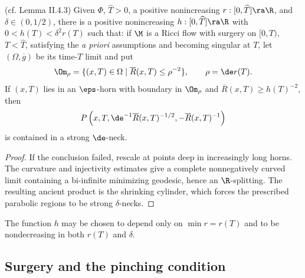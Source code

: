 \begin{lemma}
  \label{lem:kl-necks-horns-existence-ricci-flow-surgery}
(cf. Lemma II.4.3) \label{lemmaII.4.3}
\label{hexists}
Given $\Phi$, $\widehat T>0$, a positive nonincreasing
$r:[0,\widehat T]\ra\R$, and $\delta\in(0,1/2)$, there is a positive
nonincreasing $h:[0,\widehat T]\ra\R$ with $0<h(T)<\delta^2r(T)$ such that:
if $\M$ is a Ricci flow with surgery on $[0,T)$, $T<\widehat T$, satisfying
the \emph{a priori} assumptions and becoming singular at $T$, let
$(\Omega,\overline g)$ be its time-$T$ limit and put
\[
\Om_\rho=\{(x,T)\in\Omega\mid\overline R(x,T)\leq\rho^{-2}\},\qquad
\rho=\de r(T).
\]
If $(x,T)$ lies in an $\eps$-horn with boundary in $\Om_\rho$ and
$\overline R(x,T)\geq h(T)^{-2}$, then
\[
P\left(x,T,\de^{-1}\overline R(x,T)^{-1/2},-\overline R(x,T)^{-1}\right)
\]
is contained in a strong $\de$-neck.
\end{lemma}
\begin{proof}
\sketch If the conclusion failed, rescale at points deep in increasingly long
horns. The curvature and injectivity estimates give a complete nonnegatively
curved limit containing a bi-infinite minimizing geodesic, hence an
$\R$-splitting. The resulting ancient product is the shrinking cylinder,
which forces the prescribed parabolic regions to be strong $\delta$-necks.
\end{proof}

\begin{remark}
  \label{rem:kl-necks-horns-monotonicity-neck-geometry}
The function $h$ may be chosen to depend only on $\min r=r(T)$ and to be
nondecreasing in both $r(T)$ and $\delta$.
\end{remark}

\subsection{Surgery and the pinching condition} \label{surgery}

